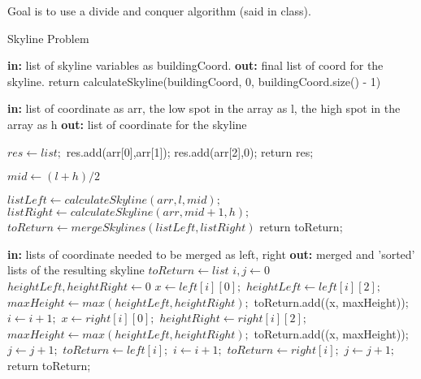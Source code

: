 \documentclass{article}
\begin{document}
Goal is to use a divide and conquer algorithm (said in class).

  	\begin{algorithm}
	\caption{Skyline Problem}\label{skyline}
        \begin{algorithmic}[1]
		 \State \textbf{in: } list of skyline variables as buildingCoord.
		 \State \textbf{out: } final list of coord for the skyline.
		 \State return calculateSkyline(buildingCoord, 0, buildingCoord.size() - 1)	
		 \EndProcedure
		 
		 \State \textbf{in: } list of coordinate as arr, the low spot in the array as l, the high spot in the array as h
		 \State \textbf{out: } list of coordinate for the skyline
		 
		 \State $res \gets list;$
		 \State res.add(arr[0],arr[1]);
		 \State res.add(arr[2],0);
		 \State return res;
		 \EndIf
		 
		 \State $mid\gets (l + h)/2$
		 
		 \State $listLeft \gets calculateSkyline(arr, l, mid);$
		 \State $listRight \gets calculateSkyline(arr, mid + 1, h);$
		 \State $toReturn \gets mergeSkylines(listLeft, listRight)$
		 \State return toReturn;
		 
		 \EndProcedure
		 
		  \State \textbf{in: } lists of coordinate needed to be merged as left, right
		 \State \textbf{out: } merged and 'sorted' lists of the resulting skyline
		 \State $toReturn \gets list$
		 \State $i, j \gets 0$
		 \State $heightLeft, heightRight \gets 0$
		\State $x \gets left[i][0];$
		\State $heightLeft \gets left[i][2];$
		\State $maxHeight \gets max(heightLeft, heightRight);$
		\State toReturn.add((x, maxHeight));
		\State $i \gets i + 1;$
		\Else
		\State $x \gets right[i][0];$
		\State $heightRight \gets right[i][2];$
		\State $maxHeight \gets max(heightLeft, heightRight);$
		\State toReturn.add((x, maxHeight));
		\State $j \gets j + 1;$
		\EndIf
		\EndWhile
		\State $toReturn \gets left[i];$
		\State $i \gets i + 1;$
		\EndWhile
		\State $toReturn \gets right[i];$
		\State $j \gets j + 1;$
		\EndWhile
		\State return toReturn;
		\EndProcedure
		 
	\end{algorithmic}
	\end{algorithm}
\end{document}
